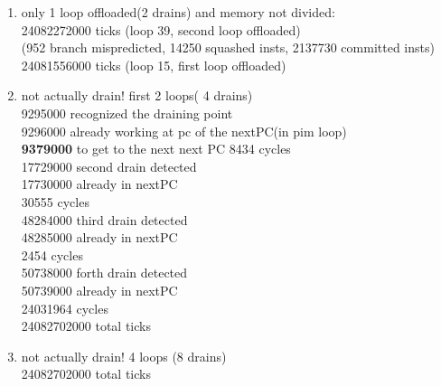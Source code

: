 \documentclass[11pt]{article}
\begin{document}
\begin{enumerate}
  \item only 1 loop offloaded(2 drains) and memory not divided:\\
	24082272000 ticks (loop 39, second loop offloaded)\\ (952 branch mispredicted, 14250 squashed insts, 2137730 committed insts)\\
  24081556000 ticks (loop 15, first loop offloaded)\\
  
  \item not actually drain! first 2 loops( 4 drains)\\
  9295000 recognized the draining point\\
  9296000 already working at pc of the nextPC(in pim loop)\\
  \textbf{9379000} to get to the next next PC
  8434 cycles\\
  17729000 second drain detected\\
  17730000 already in nextPC\\
  30555 cycles\\
  48284000 third drain detected\\
  48285000 already in nextPC\\
  2454 cycles\\
  50738000 forth drain detected\\
  50739000 already in nextPC\\
  24031964 cycles\\
  24082702000 total ticks\\
  
  \item not actually drain! 4 loops (8 drains)\\
  24082702000 total ticks
		
	
\end{enumerate}

\begin{table}[h!]
 \caption{tick time line}
 \label{tab:sum}
\end{table}
\end{document}
